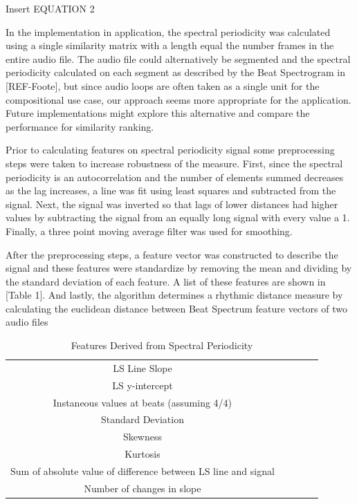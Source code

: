 \documentclass{article}
\begin{document}
Insert EQUATION 2

In the implementation in application, the spectral periodicity was calculated using a single similarity matrix with a length equal the number frames in the entire audio file. The audio file could alternatively be segmented and the spectral periodicity calculated on each segment as described by the Beat Spectrogram in [REF-Foote], but since audio loops are often taken as a single unit for the compositional use case, our approach seems more appropriate for the application. Future implementations might explore this alternative and compare the performance for similarity ranking.

Prior to calculating features on spectral periodicity signal some preprocessing steps were taken to increase robustness of the measure. First, since the spectral periodicity is an autocorrelation and the number of elements summed decreases as the lag increases, a line was fit using least squares and subtracted from the signal. Next, the signal was inverted so that lags of lower distances had higher values by subtracting the signal from an equally long signal with every value a 1. Finally, a three point moving average filter was used for smoothing.

After the preprocessing steps, a feature vector was constructed to describe the signal and these features were standardize by removing the mean and dividing by the standard deviation of each feature. A list of these features are shown in [Table 1]. And lastly, the algorithm determines a rhythmic distance measure by calculating the euclidean distance between Beat Spectrum feature vectors of two audio files

\begin{table}[h!]
  \begin{center}
    \begin{tabular}{| c | c | c | c | c |}
    \hline
    LS Line Slope \\
	LS y-intercept\\
	Instaneous values at beats (assuming 4/4) \\
	Standard Deviation \\
	Skewness \\
	Kurtosis \\
	Sum of absolute value of difference between LS line and signal \\
	Number of changes in slope \\    \hline
    \end{tabular}
  \end{center}
  \caption{Features Derived from Spectral Periodicity}
\end{table}
    
\end{document}
